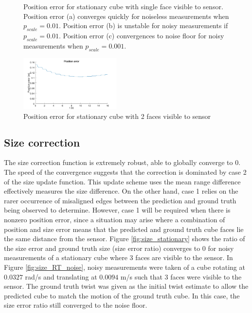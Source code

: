 \begin{figure}
{\begin{minipage}[b]{0.45\columnwidth}
 	\end{minipage}}
 	\caption{Position error for stationary cube with single face visible to sensor. Position error (a) converges quickly for noiseless measurements when $p_{scale}=0.01$. Position error (b) is unstable for noisy measurements if $p_{scale}=0.01$. Position error (c) convergences to noise floor for noisy measurements when $p_{scale}=0.001$.}
 	\label{fig:position_update_1F}
\end{figure}

\begin{figure}
\centering
	\includegraphics[width=0.45\textwidth,trim = 0mm 0mm 0mm 0mm,clip]{./Figures/position_error_4_stationary_2F}\vspace*{0ex}
	\caption{Position error for stationary cube with 2 faces visible to sensor}
  	\label{fig:position_error_4_stationary_2F}
\end{figure}

\subsection{Size correction}
The size correction function is extremely robust, able to globally converge to 0. The speed of the convergence suggests that the correction is dominated by case 2 of the size update function. This update scheme uses the mean range difference effectively measures the size difference. On the other hand, case 1 relies on the rarer occurrence of misaligned edges between the prediction and ground truth being observed to determine.
However, case 1 will be required when there is nonzero position error, since a situation may arise where a combination of position and size error means that the predicted and ground truth cube faces lie the same distance from the sensor.
Figure \ref{fig:size_stationary} shows the ratio of the size error and ground truth size (size error ratio) converges to 0 for noisy measurements of a stationary cube where 3 faces are visible to the sensor. 
In Figure \ref{fig:size_RT_noise}, noisy measurements were taken of a cube rotating at $0.0327$ rad/s and translating at $0.0094$ m/s such that 3 faces were visible to the sensor. The ground truth twist was given as the initial twist estimate to allow the predicted cube to match the motion of the ground truth cube. In this case, the size error ratio still converged to the noise floor.

